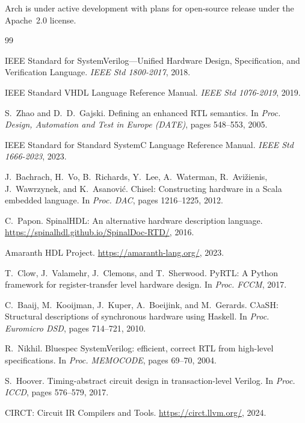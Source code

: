 \documentclass[11pt,twocolumn]{article}
\begin{document}
Arch is under active development with plans for open-source release under the Apache~2.0 license.



\begin{thebibliography}{99}

IEEE Standard for SystemVerilog---Unified Hardware Design, Specification, and Verification Language.
\textit{IEEE Std 1800-2017}, 2018.

IEEE Standard VHDL Language Reference Manual.
\textit{IEEE Std 1076-2019}, 2019.

S.~Zhao and D.~D.~Gajski.
Defining an enhanced RTL semantics.
In \textit{Proc. Design, Automation and Test in Europe (DATE)}, pages 548--553, 2005.

IEEE Standard for Standard SystemC Language Reference Manual.
\textit{IEEE Std 1666-2023}, 2023.

J.~Bachrach, H.~Vo, B.~Richards, Y.~Lee, A.~Waterman, R.~Avi\v{z}ienis, J.~Wawrzynek, and K.~Asanovi\'{c}.
Chisel: Constructing hardware in a Scala embedded language.
In \textit{Proc. DAC}, pages 1216--1225, 2012.

C.~Papon.
SpinalHDL: An alternative hardware description language.
\url{https://spinalhdl.github.io/SpinalDoc-RTD/}, 2016.

Amaranth HDL Project.
\url{https://amaranth-lang.org/}, 2023.

T.~Clow, J.~Valamehr, J.~Clemons, and T.~Sherwood.
PyRTL: A Python framework for register-transfer level hardware design.
In \textit{Proc. FCCM}, 2017.

C.~Baaij, M.~Kooijman, J.~Kuper, A.~Boeijink, and M.~Gerards.
C$\lambda$aSH: Structural descriptions of synchronous hardware using Haskell.
In \textit{Proc. Euromicro DSD}, pages 714--721, 2010.

R.~Nikhil.
Bluespec SystemVerilog: efficient, correct RTL from high-level specifications.
In \textit{Proc. MEMOCODE}, pages 69--70, 2004.

S.~Hoover.
Timing-abstract circuit design in transaction-level Verilog.
In \textit{Proc. ICCD}, pages 576--579, 2017.

CIRCT: Circuit IR Compilers and Tools.
\url{https://circt.llvm.org/}, 2024.


\end{thebibliography}
\end{document}
